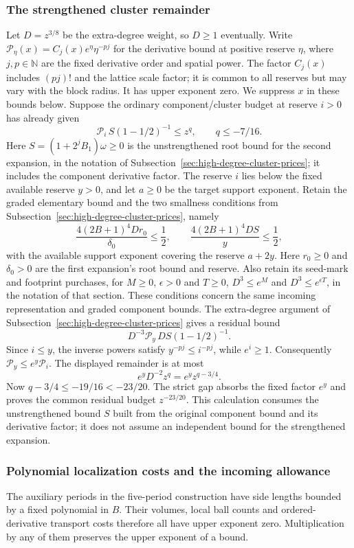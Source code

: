 \subsubsection{The strengthened cluster remainder}
Let $D=z^{3/8}$ be the extra-degree weight, so $D\ge1$ eventually. Write
$\mathcal P_\eta(x)=C_j(x)e^\eta\eta^{-pj}$ for the derivative bound at
positive reserve $\eta$, where $j,p\in\mathbb N$ are the fixed derivative
order and spatial power. The factor $C_j(x)$ includes $(pj)!$ and the
lattice scale factor; it is common to all reserves but may vary with
the block radius. It has upper exponent zero. We suppress $x$ in these
bounds below.
Suppose the ordinary component/cluster budget at reserve $i>0$
has already given
\[
            \mathcal P_i\,S(1-1/2)^{-1}\le z^q,
                         \qquad q\le-7/16.
\]
Here $S=(1+2^jB_1)\omega\ge0$ is the unstrengthened root bound for
the second expansion, in the notation of
Subsection~\ref{sec:high-degree-cluster-prices}; it includes the component
derivative factor. The reserve $i$ lies
below the fixed available reserve $y>0$, and let $a\ge0$ be the target
support exponent. Retain the graded elementary
bound and the two smallness conditions from
Subsection~\ref{sec:high-degree-cluster-prices}, namely
\[
 \frac{4(2B+1)^4D r_0}{\delta_0}\le\frac12,\qquad
 \frac{4(2B+1)^4D S}{y}\le\frac12,
\]
with the available support exponent covering the reserve $a+2y$.
Here $r_0\ge0$ and $\delta_0>0$ are the first expansion's root bound
and reserve. Also retain its seed-mark and footprint purchases, for
$M\ge0$, $\epsilon>0$ and $T\ge0$,
$D^3\le e^M$ and $D^3\le e^{\epsilon T}$, in the notation of that
section. These conditions concern the same incoming representation
and graded component bounds. The extra-degree argument
of Subsection~\ref{sec:high-degree-cluster-prices} gives a residual
bound
\[
               D^{-3}\mathcal P_y\,D S(1-1/2)^{-1}.
\]
Since $i\le y$, the inverse powers satisfy
$y^{-pj}\le i^{-pj}$, while $e^i\ge1$. Consequently
$\mathcal P_y\le e^y\mathcal P_i$. The displayed remainder is at
most
\[
                    e^yD^{-2}z^q=e^y z^{q-3/4}.
\]
Now $q-3/4\le-19/16<-23/20$. The strict gap absorbs the fixed
factor $e^y$ and proves the common residual budget $z^{-23/20}$.
This calculation consumes the unstrengthened bound $S$ built from
the original component bound and its derivative factor; it does not
assume an independent bound for the strengthened expansion.

\subsubsection{Polynomial localization costs and the incoming allowance}
The auxiliary periods in the five-period construction have side
lengths bounded by a fixed polynomial in $B$. Their volumes, local
ball counts and ordered-derivative transport costs therefore all
have upper exponent zero. Multiplication by any of them preserves
the upper exponent of a bound.

